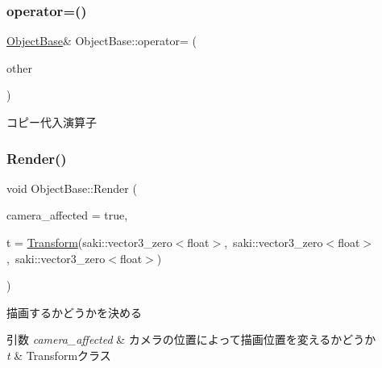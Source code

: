 \subsubsection{\texorpdfstring{operator=()}{operator=()}}
{\footnotesize\ttfamily \mbox{\hyperlink{class_object_base}{Object\+Base}}\& Object\+Base\+::operator= (\begin{DoxyParamCaption}\item[{const \mbox{\hyperlink{class_object_base}{Object\+Base}} \&}]{other }\end{DoxyParamCaption})\hspace{0.3cm}{\ttfamily [inline]}}



コピー代入演算子 

\mbox{\label{class_object_base_a0f39c1b6f0f829ed271bd0fca9fe4756}} 
\subsubsection{\texorpdfstring{Render()}{Render()}}
{\footnotesize\ttfamily void Object\+Base\+::\+Render (\begin{DoxyParamCaption}\item[{bool}]{camera\+\_\+affected = {\ttfamily true},  }\item[{const \mbox{\hyperlink{common_8h_a1c43cb8f0d8a41901f3ce4c67dbbce20}{Transform}} \&}]{t = {\ttfamily \mbox{\hyperlink{common_8h_a1c43cb8f0d8a41901f3ce4c67dbbce20}{Transform}}(saki\+:\+:vector3\+\_\+zero$<$float$>$,~saki\+:\+:vector3\+\_\+zero$<$float$>$,~saki\+:\+:vector3\+\_\+zero$<$float$>$)} }\end{DoxyParamCaption})}



描画するかどうかを決める 


\begin{DoxyParams}{引数}
{\em camera\+\_\+affected} & カメラの位置によって描画位置を変えるかどうか \\
\hline
{\em t} & Transformクラス \\
\hline
\end{DoxyParams}
\mbox{\label{class_object_base_aeac51d868beeb7f7fe900407b76b93a2}} 
